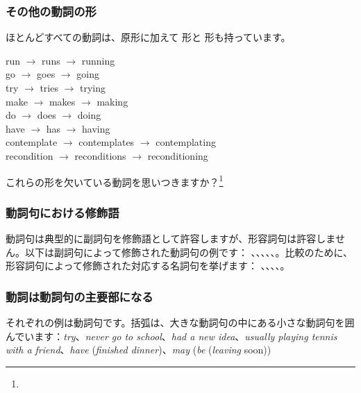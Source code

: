 \subsubsection*{その他の動詞の形}
ほとんどすべての動詞は、原形に加えて  形と  形も持っています。

\ea
run $\rightarrow$ runs $\rightarrow$ running\\
go $\rightarrow$ goes $\rightarrow$ going\\
try $\rightarrow$ tries $\rightarrow$ trying\\
make $\rightarrow$ makes $\rightarrow$ making\\
do $\rightarrow$ does $\rightarrow$ doing\\
have $\rightarrow$ has $\rightarrow$ having\\
contemplate $\rightarrow$ contemplates $\rightarrow$ contemplating\\
recondition $\rightarrow$ reconditions $\rightarrow$ reconditioning
\z

これらの形を欠いている動詞を思いつきますか？\footnote{
}

\subsubsection*{動詞句における修飾語}
動詞句は典型的に副詞句を修飾語として許容しますが、形容詞句は許容しません。以下は副詞句によって修飾された動詞句の例です： 、、、、、。比較のために、形容詞句によって修飾された対応する名詞句を挙げます： 、、、、。

\subsubsection*{動詞は動詞句の主要部になる}
それぞれの例は動詞句です。括弧は、大きな動詞句の中にある小さな動詞句を囲んでいます：\textit{\emph{try}}、\textit{never \emph{go} to school}、\textit{\emph{had} a new idea}、\textit{usually \emph{playing} tennis with a friend}、\textit{\emph{have} }(\textit{\emph{finished} dinner})、\textit{\emph{may} }(\textit{\emph{be} }(\emph{leaving} soon))

